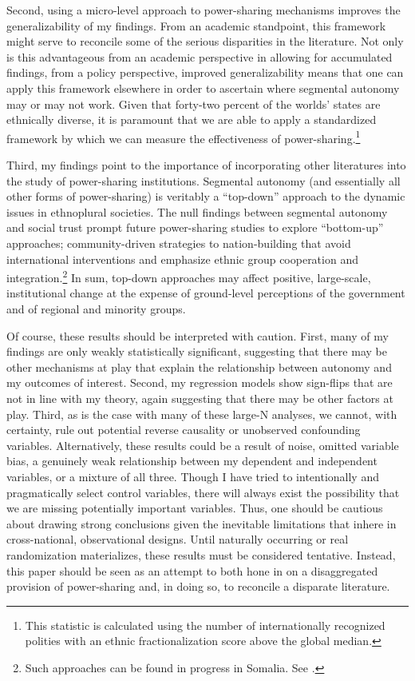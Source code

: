 \documentclass[12pt]{article}
\begin{document}
Second, using a micro-level approach to power-sharing mechanisms improves the generalizability of my findings. From an academic standpoint, this framework might serve to reconcile some of the serious disparities in the literature. Not only is this advantageous from an academic perspective in allowing for accumulated findings, from a policy perspective, improved generalizability means that one can apply this framework elsewhere in order to ascertain where segmental autonomy may or may not work. Given that forty-two percent of the worlds' states are ethnically diverse, it is paramount that we are able to apply a standardized framework by which we can measure the effectiveness of power-sharing.\footnote{This statistic is calculated using the number of internationally recognized polities with an ethnic fractionalization score above the global median.} 

Third, my findings point to the importance of incorporating other literatures into the study of power-sharing institutions. Segmental autonomy (and essentially all other forms of power-sharing) is veritably a ``top-down'' approach to the dynamic issues in ethnoplural societies. The null findings between segmental autonomy and social trust prompt future power-sharing studies to explore ``bottom-up'' approaches; community-driven strategies to nation-building that avoid international interventions and emphasize ethnic group cooperation and integration.\footnote{Such approaches can be found in progress in Somalia. See \cite{arteh_state-building_2016}.} In sum, top-down approaches may affect positive, large-scale, institutional change at the expense of ground-level perceptions of the government and of regional and minority groups.  

Of course, these results should be interpreted with caution. First, many of my findings are only weakly statistically significant, suggesting that there may be other mechanisms at play that explain the relationship between autonomy and my outcomes of interest. Second, my regression models show sign-flips that are not in line with my theory, again suggesting that there may be other factors at play. Third, as is the case with many of these large-N analyses, we cannot, with certainty, rule out potential reverse causality or unobserved confounding variables. Alternatively, these results could be a result of noise, omitted variable bias, a genuinely weak relationship between my dependent and independent variables, or a mixture of all three. Though I have tried to intentionally and pragmatically select control variables, there will always exist the possibility that we are missing potentially important variables. Thus, one should be cautious about drawing strong conclusions given the inevitable limitations that inhere in cross-national, observational designs. Until naturally occurring or real randomization materializes, these results must be considered tentative. Instead, this paper should be seen as an attempt to both hone in on a disaggregated provision of power-sharing and, in doing so, to reconcile a disparate literature.
\end{document}
